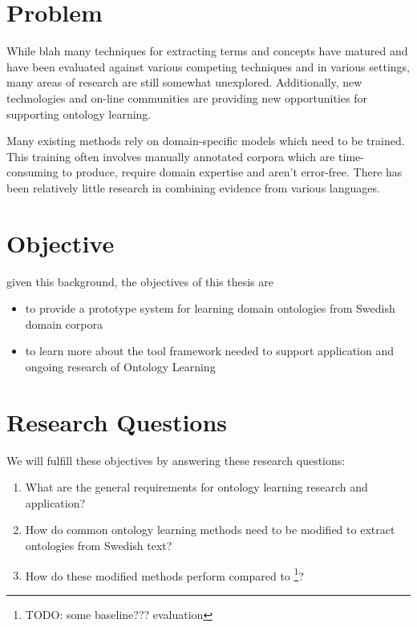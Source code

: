 \documentclass[a4paper]{report}
\newcommand{\todo}[1]{\footnote{{\color{red} TODO: #1}}}
\begin{document}
\section{Problem}

While blah many techniques for extracting terms and concepts have matured and have been evaluated against various competing techniques and in various settings, many areas of research are still somewhat unexplored.
Additionally, new technologies and on-line communities are providing new opportunities for supporting ontology learning.

Many existing methods rely on domain-specific models which need to be trained.
This training often involves manually annotated corpora which are time-consuming to produce, require domain expertise and aren't error-free.
There has been relatively little research in combining evidence from various languages.

\section{Objective}

given this background, the objectives of this thesis are

\begin{itemize}
  \item to provide a prototype system for learning domain ontologies from Swedish domain corpora
  \item to learn more about the tool framework needed to support application and ongoing research of Ontology Learning
\end{itemize}

\section{Research Questions}

We will fulfill these objectives by answering these research questions:

\begin{enumerate}
  \item{What are the general requirements for ontology learning research and application?}
  \item{How do common ontology learning methods need to be modified to extract ontologies from Swedish text?}
  \item{How do these modified methods perform compared to \todo{some baseline??? evaluation}?}
\end{enumerate}
\end{document}
